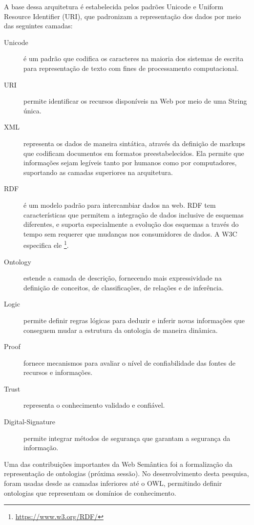 A base dessa arquitetura é estabelecida pelos padrões \foreignlanguage{english}{Unicode}
e \foreignlanguage{english}{Uniform Resource Identifier} (URI),
que padronizam a representação dos dados por meio das seguintes camadas: 
%
\begin{description}
\item [{Unicode}] \foreignlanguage{brazil}{é um padrão que codifica os
caracteres na maioria dos sistemas de escrita para representação de
texto com fines de processamento computacional.}
\item [{URI}] \foreignlanguage{brazil}{permite identificar os recursos
disponíveis na Web por meio de uma }String\foreignlanguage{brazil}{
única.}
\item [{XML\foreignlanguage{brazil}{}}] \foreignlanguage{brazil}{representa
os dados de maneira sintática, através da definição de }markups\foreignlanguage{brazil}{
que codificam documentos em formatos preestabelecidos. Ela permite
que informações sejam legíveis tanto por humanos como por computadores,
suportando as camadas superiores na arquitetura.}
\item [{RDF}] \foreignlanguage{brazil}{é um modelo padrão para intercambiar
dados na web. }RDF\foreignlanguage{brazil}{ tem características que
permitem a integração de dados inclusive de esquemas diferentes, e
suporta especialmente a evolução dos esquemas a través do tempo sem
requerer que mudanças nos consumidores de dados. A W3C especifica
ele }\footnote{%
\url{https://www.w3.org/RDF/}%
}\foreignlanguage{brazil}{.}
\item [{Ontology}] \foreignlanguage{brazil}{estende a camada de descrição,
fornecendo mais expressividade na definição de conceitos, de classificações,
de relações e de inferência.}
\item [{Logic}] \foreignlanguage{brazil}{permite definir regras lógicas
para deduzir e inferir novas informações que conseguem mudar a estrutura
da ontologia de maneira dinâmica.}
\item [{Proof}] \foreignlanguage{brazil}{fornece mecanismos para avaliar
o nível de confiabilidade das fontes de recursos e informações.}
\item [{Trust}] \foreignlanguage{brazil}{representa o conhecimento validado
e confiável.}
\item [{Digital-Signature}] \foreignlanguage{brazil}{permite integrar métodos
de segurança que garantam a segurança da informação.}
\end{description}
%
Uma das contribuições importantes da Web Semântica foi a formalização
da representação de ontologias (próxima sessão). No desenvolvimento
desta pesquisa, foram usadas desde as camadas inferiores até o \foreignlanguage{english}{OWL},
permitindo definir ontologias que representam os domínios de conhecimento.

